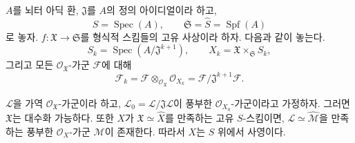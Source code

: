 \begin{theorem}[5.4.5]
\label{III.5.4.5-fr}
$A$를 뇌터 아딕 환, $\mathfrak J$를 $A$의 정의 아이디얼이라 하고,
\[
S=\operatorname{Spec}(A),\qquad
\mathfrak S=\widehat S=\operatorname{Spf}(A)
\]
로 놓자. $f:\mathfrak X\to\mathfrak S$를 형식적 스킴들의 고유
사상이라 하자. 다음과 같이 놓는다.
\[
S_k=\operatorname{Spec}(A/\mathfrak J^{k+1}),\qquad
X_k=\mathfrak X\times_{\mathfrak S}S_k,
\]
그리고 모든 $\mathcal O_{\mathfrak X}$-가군 $\mathcal F$에 대해
\[
\mathcal F_k
=\mathcal F\otimes_{\mathcal O_{\mathfrak X}}\mathcal O_{X_k}
=\mathcal F/\mathfrak J^{k+1}\mathcal F.
\]


$\mathcal L$을 가역 $\mathcal O_{\mathfrak X}$-가군이라 하고,
$\mathcal L_0=\mathcal L/\mathfrak J\mathcal L$이 풍부한
$\mathcal O_{X_0}$-가군이라고 가정하자. 그러면 $\mathfrak X$는
대수화 가능하다. 또한 $X$가 $\mathfrak X\simeq\widehat X$를
만족하는 고유 $S$-스킴이면, $\mathcal L\simeq\widehat{\mathcal M}$을
만족하는 풍부한 $\mathcal O_X$-가군 $\mathcal M$이 존재한다.
따라서 $X$는 $S$ 위에서 사영이다.
\end{theorem}

